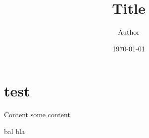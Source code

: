 \documentclass{beamer}
\title{Title}
\author{Author}
\date{\today}
\institute{Institute}
\begin{document}
    \begin{frame}[plain]
        \titlepage
    \end{frame}
    \begin{frame}[plain]
        \tableofcontents
    \end{frame}
    \section{test}
    \begin{frame}{Content}
        some content
        \begin{definition}
            bal bla
        \end{definition}
    \end{frame}
\end{document}
